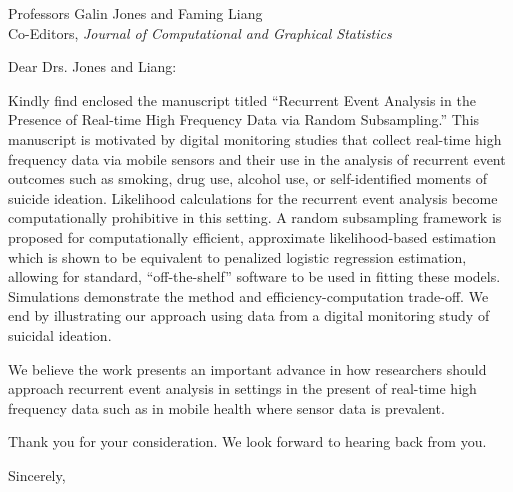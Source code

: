 \documentclass[11pt]{letter} %
\begin{document}

\begin{letter}{Professors Galin Jones and Faming Liang \\
    Co-Editors, {\em Journal of Computational and Graphical Statistics}
         }


\signature{Walter Dempsey\\
University of Michigan \\
Department of Biostatistics\\
M4057 SPH II \\
1415 Washington Heights \\
wdem@umich.edu} %


\date\today

\opening{Dear Drs. Jones and Liang:}

Kindly find enclosed the manuscript titled ``Recurrent Event Analysis in the Presence of Real-time High Frequency Data via Random Subsampling.''  This manuscript is motivated by digital monitoring studies that collect real-time high frequency data via mobile sensors and their use in the analysis of recurrent event outcomes such as smoking, drug use, alcohol use, or self-identified moments of suicide ideation. Likelihood calculations for the recurrent event analysis become computationally prohibitive in this setting. A random subsampling framework is proposed for computationally efficient, approximate likelihood-based estimation which is shown to be equivalent to penalized logistic regression estimation, allowing for standard, ``off-the-shelf'' software to be used in fitting these models. Simulations demonstrate the method and efficiency-computation trade-off. We end by illustrating our approach using data from a digital monitoring study of suicidal ideation.

We believe the work presents an important advance in how researchers should approach recurrent event analysis in settings in the present of real-time high frequency data such as in mobile health where sensor data is prevalent.

Thank you for your consideration. We look forward to hearing back from you.

\closing{Sincerely,}


\end{letter}
\end{document}
